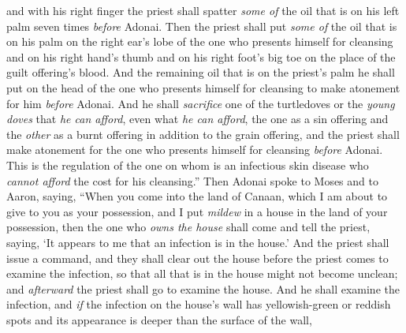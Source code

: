 \begin{biblechapter}
\verse and with his right finger the priest shall spatter \textit{some of} the oil that is on his left palm seven times \textit{before} Adonai.
\verse Then the priest shall put \textit{some of} the oil that is on his palm on the right ear’s lobe of the one who presents himself for cleansing and on his right hand’s thumb and on his right foot’s big toe on the place of the guilt offering’s blood.
\verse And the remaining oil that is on the priest’s palm he shall put on the head of the one who presents himself for cleansing to make atonement for him \textit{before} Adonai.
\verse And he shall \textit{sacrifice} one of the turtledoves or the \textit{young doves} that \textit{he can afford},
\verse even what \textit{he can afford}, the one as a sin offering and the \textit{other} as a burnt offering in addition to the grain offering, and the priest shall make atonement for the one who presents himself for cleansing \textit{before} Adonai.
\verse This is the regulation of the one on whom is an infectious skin disease who \textit{cannot afford} the cost for his cleansing.”
 Then Adonai spoke to Moses and to Aaron, saying,
\verse “When you come into the land of Canaan, which I am about to give to you as your possession, and I put \textit{mildew} in a house in the land of your possession,
\verse then the one who \textit{owns the house} shall come and tell the priest, saying, ‘It appears to me that an infection is in the house.’
\verse And the priest shall issue a command, and they shall clear out the house before the priest comes to examine the infection, so that all that is in the house might not become unclean; and \textit{afterward} the priest shall go to examine the house.
\verse And he shall examine the infection, and \textit{if} the infection on the house’s wall has yellowish-green or reddish spots and its appearance is deeper than the surface of the wall,

\end{biblechapter}
